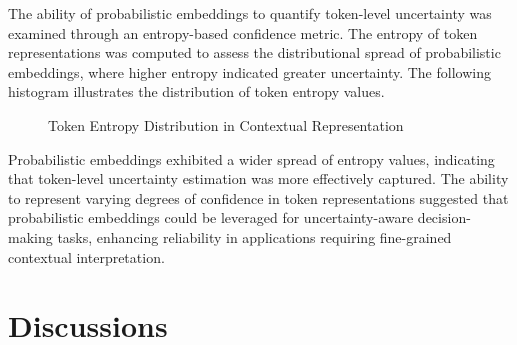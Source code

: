 \documentclass{article}
\begin{document}
The ability of probabilistic embeddings to quantify token-level uncertainty was examined through an entropy-based confidence metric. The entropy of token representations was computed to assess the distributional spread of probabilistic embeddings, where higher entropy indicated greater uncertainty. The following histogram illustrates the distribution of token entropy values.

\begin{figure}[ht]
	\centering
	\caption{Token Entropy Distribution in Contextual Representation}
	\label{fig:token_entropy}
\end{figure}

Probabilistic embeddings exhibited a wider spread of entropy values, indicating that token-level uncertainty estimation was more effectively captured. The ability to represent varying degrees of confidence in token representations suggested that probabilistic embeddings could be leveraged for uncertainty-aware decision-making tasks, enhancing reliability in applications requiring fine-grained contextual interpretation.


\section{Discussions}
\end{document}
